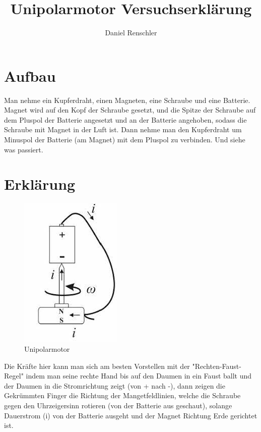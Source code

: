 \documentclass[10p]{article}
\begin{document}
\title{Unipolarmotor Versuchserklärung}
\author{Daniel Renschler}
\maketitle
{}


\section*{Aufbau}
Man nehme ein Kupferdraht, einen Magneten, eine Schraube und eine Batterie. Magnet
wird auf den Kopf der Schraube gesetzt, und die Spitze der Schraube auf dem
Pluspol der Batterie angesetzt und an der Batterie angehoben, sodass die Schraube mit
Magnet in der Luft ist. Dann nehme man den Kupferdraht um Minuspol der Batterie
(am Magnet) mit dem Pluspol zu verbinden. Und siehe was passiert.
\section*{Erklärung}

\begin{figure}
\centering
\includegraphics[width=.4\linewidth]{Unipolar1.jpeg}
\caption{Unipolarmotor \cite{assis2012ampere}}
\label{fig:wrapfig}
\end{figure}

Die Kräfte hier kann man sich am besten Vorstellen mit der "Rechten-Faust-Regel"
indem man seine rechte Hand bis auf den Daumen in ein Faust ballt und der Daumen
in die Stromrichtung zeigt (von + nach -), dann zeigen die Gekrümmten Finger die
Richtung der Mangetfeldlinien, welche die Schraube gegen den Uhrzeigersinn
rotieren (von der Batterie aus geschaut), solange Dauerstrom (i) von der
Batterie ausgeht und der Magnet Richtung Erde gerichtet ist. 


\printbibliography
\end{document}

